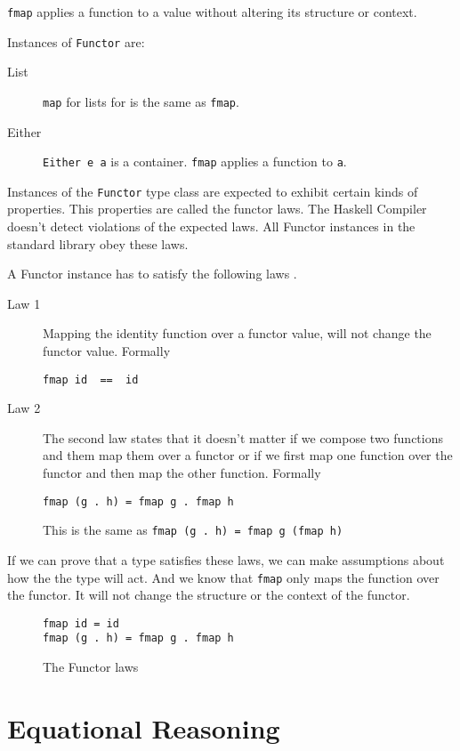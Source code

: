 \documentclass[twoside, a4paper]{article}
\begin{document}
\verb|fmap| applies a function to a value without altering its structure or context.

Instances of \verb|Functor| are:

\begin{description}
\item[List] \verb|map| for lists for is the same as \verb|fmap|.
\item[Either] \verb|Either e a| is a container. \verb|fmap| applies a function to \verb|a|.
\end{description}

Instances of the \verb|Functor| type class are expected to exhibit certain kinds of properties. This properties are called the functor laws.
The Haskell Compiler doesn't detect violations of the expected laws. All Functor instances in the standard library obey these laws.

A Functor instance has to satisfy the following laws \cite{Marlow_2010}.

\begin{description}
\item[Law 1] Mapping the identity function over a functor value, will not change the functor value. Formally
\begin{verbatim}
fmap id  ==  id
\end{verbatim}
\item[Law 2] The second law states that it doesn't matter if we compose two functions and them map them over a functor or if we first map one function over the functor and then map the other function. Formally
\begin{verbatim}
fmap (g . h) = fmap g . fmap h
\end{verbatim}
This is the same as \verb|fmap (g . h) = fmap g (fmap h)|
\end{description}

If we can prove that a type satisfies these laws, we can make assumptions about how the the type will act. And we know that \verb|fmap| only maps the function over the functor. It will not change the structure or the context of the functor.

\begin{figure}
  \centering
\begin{verbatim}
fmap id = id
fmap (g . h) = fmap g . fmap h
\end{verbatim}
  \caption{The Functor laws}
  \label{fig:functorlaws}
\end{figure}

\section{Equational Reasoning}
\label{sec:equationalreasoning}
\end{document}
